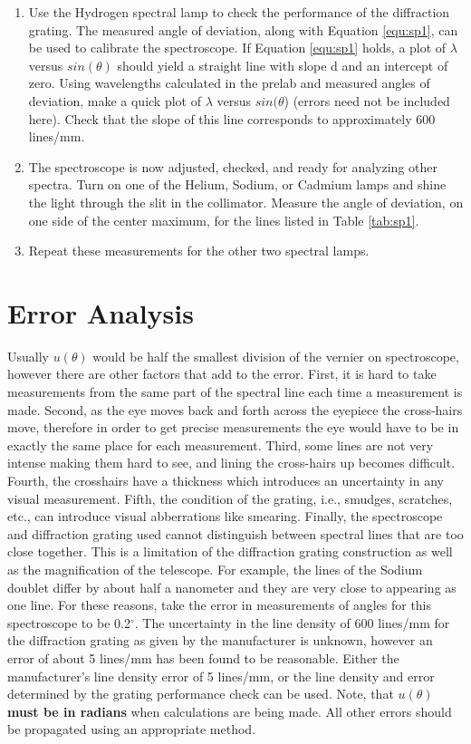 \begin{enumerate}
\item Use the Hydrogen spectral lamp to check the performance of the diffraction grating. The measured angle of deviation, along with Equation \ref{equ:sp1}, can be used to calibrate the spectroscope. If Equation \ref{equ:sp1} holds, a plot of $\lambda$ versus $sin(\theta)$ should yield a straight line with slope d and an intercept of zero. Using wavelengths calculated in the prelab and measured angles of deviation, make a quick plot of $\lambda$ versus $sin(\theta$) (errors need not be included here). Check that the slope of this line corresponds to approximately 600 lines/mm.

\item The spectroscope is now adjusted, checked, and ready for analyzing other spectra. Turn on one of the Helium, Sodium, or Cadmium lamps and shine the light through the slit in the collimator. Measure the angle of deviation, on one side of the center maximum, for the lines listed in Table \ref{tab:sp1}.

\item Repeat these measurements for the other two spectral lamps.

\end{enumerate}

\section{Error Analysis}
Usually $u(\theta)$ would be half the smallest division of the vernier on spectroscope, however there are other factors that add to the error. First, it is hard to take measurements from the same part of the spectral line each time a measurement is made. Second, as the eye moves back and forth across the eyepiece the cross-hairs move, therefore in order to get precise measurements the eye would have to be in exactly the same place for each measurement. Third, some lines are not very intense making them hard to see, and lining the cross-hairs up becomes difficult. Fourth, the crosshairs have a thickness which introduces an uncertainty in any visual measurement. Fifth, the condition of the grating, i.e., smudges, scratches, etc., can introduce visual abberrations like smearing. Finally, the spectroscope and diffraction grating used cannot distinguish between spectral lines that are too close together. This is a limitation of the diffraction grating construction as well as the magnification of the telescope. For example, the lines of the Sodium doublet differ by about half a nanometer and they are very close to appearing as one line. For these reasons, take the error in measurements of angles for this spectroscope to be 0.2$^{\circ}$. The uncertainty in the line density of 600 lines/mm for the diffraction grating as given by the manufacturer is unknown, however an error of about 5 lines/mm has been found to be reasonable. Either the manufacturer's line density error of 5 lines/mm, or the line density and error determined by the grating performance check can be used. Note, that {\bf $u(\theta)$ must be in radians} when calculations are being made. All other errors should be propagated using an appropriate method. 

